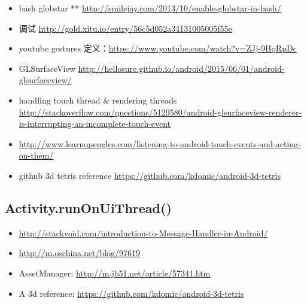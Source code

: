 \documentclass[9pt,b5paper]{article}
\begin{document}
\begin{itemize}
\item bash globstar ** \url{http://smilejay.com/2013/10/enable-globstar-in-bash/}
\item 调试 \url{http://gold.xitu.io/entry/56c5d052a34131005005f55e}
\item youtube gestures 定义：\url{https://www.youtube.com/watch?v=ZJj-9HqRpDc}
\item GLSurfaceView \url{http://hellosure.github.io/android/2015/06/01/android-glsurfaceview/}
\item handling touch thread \& rendering threads \url{http://stackoverflow.com/questions/5129580/android-glsurfaceview-renderer-is-interrupting-an-incomplete-touch-event}
\item \url{http://www.learnopengles.com/listening-to-android-touch-events-and-acting-on-them/}
\item github 3d tetris reference \url{https://github.com/kdomic/android-3d-tetris}
\end{itemize}

\subsection{Activity.runOnUiThread()}
\label{sec-2-3}
\begin{itemize}
\item \url{http://stackvoid.com/introduction-to-Message-Handler-in-Android/}
\item \url{http://m.oschina.net/blog/97619}
\item AssetManager: \url{http://m.jb51.net/article/57341.htm}
\item A 3d reference: \url{https://github.com/kdomic/android-3d-tetris}
\end{itemize}
\end{document}
